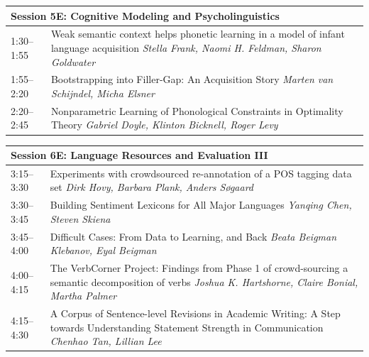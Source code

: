 \documentclass{book}
\renewcommand{\large}{\fontsize{36}{40}\selectfont}
\begin{document}
\begin{tabular}{p{3in}p{16in}}
  \multicolumn{2}{l}{\bfseries\large Session 5E: Cognitive Modeling and Psycholinguistics} \\\hline

    
    1:30--1:55
    &	Weak semantic context helps phonetic learning in a model of infant language acquisition \newline 
    {\itshape Stella Frank, Naomi H. Feldman, Sharon Goldwater} \\
    
    1:55--2:20
    &	Bootstrapping into Filler-Gap: An Acquisition Story \newline 
    {\itshape Marten van Schijndel, Micha Elsner} \\
    
    2:20--2:45
    &	Nonparametric Learning of Phonological Constraints in Optimality Theory \newline 
    {\itshape Gabriel Doyle, Klinton Bicknell, Roger Levy} \\
    
\end{tabular}

\begin{tabular}{p{3in}p{16in}}
  \multicolumn{2}{l}{\bfseries\large Session 6E: Language Resources and Evaluation III} \\\hline

    
    3:15--3:30
    &	Experiments with crowdsourced re-annotation of a POS tagging data set \newline 
    {\itshape Dirk Hovy, Barbara Plank, Anders Søgaard} \\
    
    3:30--3:45
    &	Building Sentiment Lexicons for All Major Languages \newline 
    {\itshape Yanqing Chen, Steven Skiena} \\
    
    3:45--4:00
    &	Difficult Cases: From Data to Learning, and Back \newline 
    {\itshape Beata Beigman Klebanov, Eyal Beigman} \\
    
    4:00--4:15
    &	The VerbCorner Project: Findings from Phase 1 of crowd-sourcing a semantic decomposition of verbs \newline 
    {\itshape Joshua K. Hartshorne, Claire Bonial, Martha Palmer} \\
    
    4:15--4:30
    &	A Corpus of Sentence-level Revisions in Academic Writing: A Step towards Understanding Statement Strength in Communication \newline 
    {\itshape Chenhao Tan, Lillian Lee} \\
    
\end{tabular}
\end{document}
